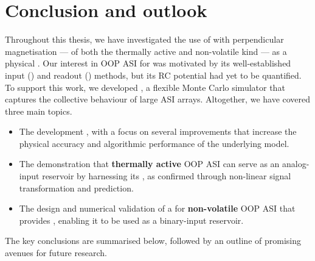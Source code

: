 \chapter{Conclusion and outlook}\label{ch:Conclusion}

Throughout this thesis, we have investigated the use of  with perpendicular magnetisation --- of both the thermally active and non-volatile kind --- as a physical .
Our interest in OOP ASI for  was motivated by its well-established input () and readout () methods, but its RC potential had yet to be quantified.
To support this work, we developed \hotspice, a flexible Monte Carlo simulator that captures the collective behaviour of large ASI arrays.
Altogether, we have covered three main topics.
\begin{itemize}
	\item The development \textbf{\hotspice}, with a focus on several improvements that increase the physical accuracy and algorithmic performance of the underlying model.
	\item The demonstration that \textbf{thermally active} OOP ASI can serve as an analog-input reservoir by harnessing its , as confirmed through non-linear signal transformation and prediction.
	\item The design and numerical validation of a  for \textbf{non-volatile} OOP ASI that provides , enabling it to be used as a binary-input reservoir.
\end{itemize}
The key conclusions are summarised below, followed by an outline of promising avenues for future research.

\newpage
